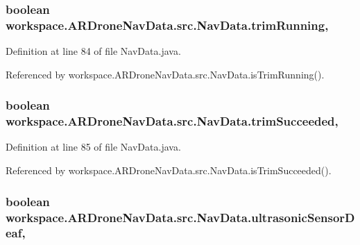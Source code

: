 \subsubsection[{trim\+Running}]{\setlength{\rightskip}{0pt plus 5cm}boolean workspace.\+A\+R\+Drone\+Nav\+Data.\+src.\+Nav\+Data.\+trim\+Running\hspace{0.3cm}{\ttfamily [static]}, {\ttfamily [protected]}}\label{classworkspace_1_1_a_r_drone_nav_data_1_1src_1_1_nav_data_a6c6665207779b66bc0c5dafcfad01cfa}


Definition at line 84 of file Nav\+Data.\+java.



Referenced by workspace.\+A\+R\+Drone\+Nav\+Data.\+src.\+Nav\+Data.\+is\+Trim\+Running().

\hypertarget{classworkspace_1_1_a_r_drone_nav_data_1_1src_1_1_nav_data_a86153ea6a1c060502dc5f45ae1768afd}{}
\subsubsection[{trim\+Succeeded}]{\setlength{\rightskip}{0pt plus 5cm}boolean workspace.\+A\+R\+Drone\+Nav\+Data.\+src.\+Nav\+Data.\+trim\+Succeeded\hspace{0.3cm}{\ttfamily [static]}, {\ttfamily [protected]}}\label{classworkspace_1_1_a_r_drone_nav_data_1_1src_1_1_nav_data_a86153ea6a1c060502dc5f45ae1768afd}


Definition at line 85 of file Nav\+Data.\+java.



Referenced by workspace.\+A\+R\+Drone\+Nav\+Data.\+src.\+Nav\+Data.\+is\+Trim\+Succeeded().

\hypertarget{classworkspace_1_1_a_r_drone_nav_data_1_1src_1_1_nav_data_ac571af7d7457738b2b7dc4eab59f2cbb}{}
\subsubsection[{ultrasonic\+Sensor\+Deaf}]{\setlength{\rightskip}{0pt plus 5cm}boolean workspace.\+A\+R\+Drone\+Nav\+Data.\+src.\+Nav\+Data.\+ultrasonic\+Sensor\+Deaf\hspace{0.3cm}{\ttfamily [static]}, {\ttfamily [protected]}}\label{classworkspace_1_1_a_r_drone_nav_data_1_1src_1_1_nav_data_ac571af7d7457738b2b7dc4eab59f2cbb}


